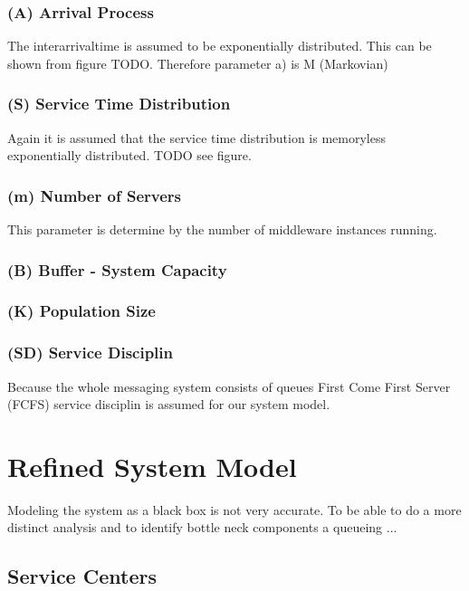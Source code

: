 \documentclass[a4paper]{article}
\begin{document}
\subsubsection{(A) Arrival Process}

The interarrivaltime is assumed to be exponentially distributed. This can be shown from figure TODO. Therefore parameter a) is M (Markovian)

\subsubsection{(S) Service Time Distribution }

Again it is assumed that the service time distribution is memoryless exponentially distributed. TODO see figure.

\subsubsection{(m) Number of Servers}

This parameter is determine by the number of middleware instances running.

\subsubsection{(B) Buffer - System Capacity }


\subsubsection{(K) Population Size}


\subsubsection{(SD) Service Disciplin}
Because the whole messaging system consists of queues  First Come First Server (FCFS) service disciplin is assumed for our system model.


\section{Refined System Model}

Modeling the system as a black box is not very accurate. To be able to do a more distinct analysis and to identify bottle neck components a queueing ...

\subsection{Service Centers}
\end{document}
